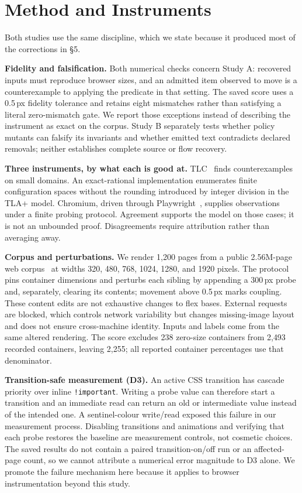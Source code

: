 \documentclass[acmsmall,screen,review,anonymous,nonacm]{acmart}
\newcommand{\code}[1]{\texttt{\small #1}}
\begin{document}
\section{Method and Instruments}
Both studies use the same discipline, which we state because it produced most of the corrections in \S5.

\textbf{Fidelity and falsification.} Both numerical checks concern Study A: recovered inputs must reproduce browser sizes, and an admitted item observed to move is a counterexample to applying the predicate in that setting. The saved score uses a 0.5\,px fidelity tolerance and retains eight mismatches rather than satisfying a literal zero-mismatch gate. We report those exceptions instead of describing the instrument as exact on the corpus. Study B separately tests whether policy mutants can falsify its invariants and whether emitted text contradicts declared removals; neither establishes complete source or flow recovery.

\textbf{Three instruments, by what each is good at.} TLC~\cite{lamport2002} finds counterexamples on small domains. An exact-rational implementation enumerates finite configuration spaces without the rounding introduced by integer division in the TLA+ model. Chromium, driven through Playwright~\cite{playwright}, supplies observations under a finite probing protocol. Agreement supports the model on those cases; it is not an unbounded proof. Disagreements require attribution rather than averaging away.

\textbf{Corpus and perturbations.} We render 1{,}200 pages from a public 2.56M-page web corpus~\cite{webcode2m} at widths 320, 480, 768, 1024, 1280, and 1920 pixels. The protocol pins container dimensions and perturbs each sibling by appending a 300\,px probe and, separately, clearing its contents; movement above 0.5\,px marks coupling. These content edits are not exhaustive changes to flex bases. External requests are blocked, which controls network variability but changes missing-image layout and does not ensure cross-machine identity. Inputs and labels come from the same altered rendering. The score excludes 238 zero-size containers from 2{,}493 recorded containers, leaving 2{,}255; all reported container percentages use that denominator.

\textbf{Transition-safe measurement (D3).} An active CSS transition has cascade priority over inline \code{!important}. Writing a probe value can therefore start a transition and an immediate read can return an old or intermediate value instead of the intended one. A sentinel-colour write/read exposed this failure in our measurement process. Disabling transitions and animations and verifying that each probe restores the baseline are measurement controls, not cosmetic choices. The saved results do not contain a paired transition-on/off run or an affected-page count, so we cannot attribute a numerical error magnitude to D3 alone. We promote the failure mechanism here because it applies to browser instrumentation beyond this study.
\end{document}
